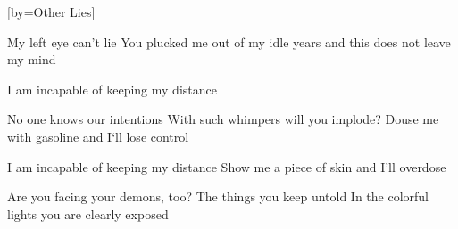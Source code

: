 [by={Other Lies}]

  \chordsoff
  \beginverse
  My left eye can’t lie
  You plucked me out of my idle years
  and this does not leave my mind
  \endverse

  \beginverse

  I am incapable of keeping my distance 
  \endverse

  \beginverse

  No one knows our intentions
  With such whimpers will you implode?
  Douse me with gasoline and I‘ll lose control
  \endverse

  \beginverse

  I am incapable of keeping my distance 
  Show me a piece of skin and I’ll overdose
  \endverse

  \beginverse

  Are you facing your demons, too? 
  The things you keep untold
  In the colorful lights you are clearly exposed
  \endverse
\endsong
